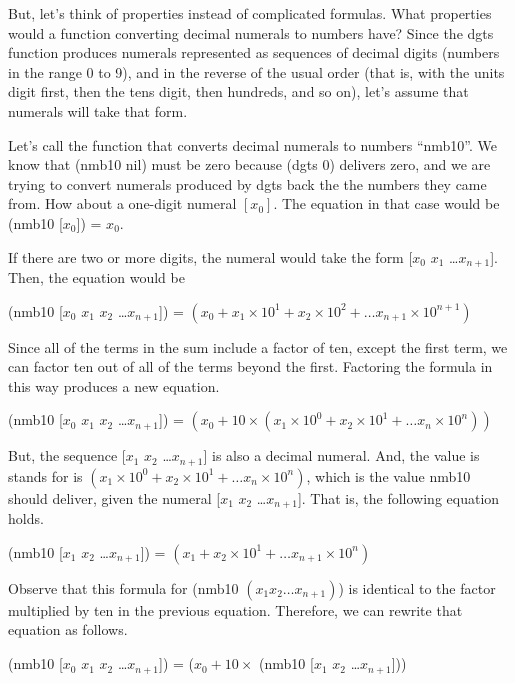 
But, let's think of properties instead of complicated formulas.
What properties would a function
converting decimal numerals to numbers have?
Since the dgts function produces numerals represented as sequences
of decimal digits (numbers in the range 0 to 9),
and in the reverse of the usual order
(that is, with the units digit first,
then the tens digit, then hundreds, and so on),
let's assume that numerals will take that form.

Let's call the function that converts decimal numerals to numbers  ``nmb10''.
We know that (nmb10 nil) must be zero because (dgts 0) delivers
zero, and we are trying to convert numerals produced by dgts
back the the numbers they came from.
How about a one-digit numeral $[x_0]$.
The equation in that case would be (nmb10 [$x_0$]) = $x_0$.

If there are two or more digits, the numeral would take the form
[$x_0$ $x_1$ \dots $x_{n+1}$].
Then, the equation would be
\begin{center}
(nmb10 [$x_0$ $x_1$ $x_2$ \dots $x_{n+1}$]) =
$(x_0 + x_1 \times 10^1 + x_2 \times 10^2 + \dots x_{n+1} \times 10^{n+1})$
\end{center}


Since all of the terms in the sum
include a factor of ten, except the first term,
we can factor ten out of all of the terms beyond the first.
Factoring the formula in this way produces a new equation.
\begin{center}
(nmb10 [$x_0$ $x_1$ $x_2$ \dots $x_{n+1}$]) = $(x_0 + 10 \times (x_1 \times 10^0 + x_2 \times 10^1 + \dots x_n \times 10^n))$
\end{center}


But, the sequence [$x_1$ $x_2$ \dots $x_{n+1}$] is also a decimal numeral.
And, the value is stands for is
$(x_1 \times 10^0 + x_2 \times 10^1 + \dots x_n \times 10^n)$,
which is the value nmb10 should deliver, given the numeral [$x_1$ $x_2$ \dots $x_{n+1}$].
That is, the following equation holds.
\begin{center}
(nmb10 [$x_1$ $x_2$ \dots $x_{n+1}$]) = $(x_1 + x_2 \times 10^1 + \dots x_{n+1} \times 10^n)$
\end{center}


Observe that this formula for (nmb10 $(x_1 x_2 \dots x_{n+1})$) is identical
to the factor multiplied by ten in the previous equation.
Therefore, we can rewrite that equation as follows.
\begin{center}
(nmb10 [$x_0$ $x_1$ $x_2$ \dots $x_{n+1}$]) = ($x_0 + 10 \times$ (nmb10 [$x_1$ $x_2$ \dots $x_{n+1}$]))
\end{center}

